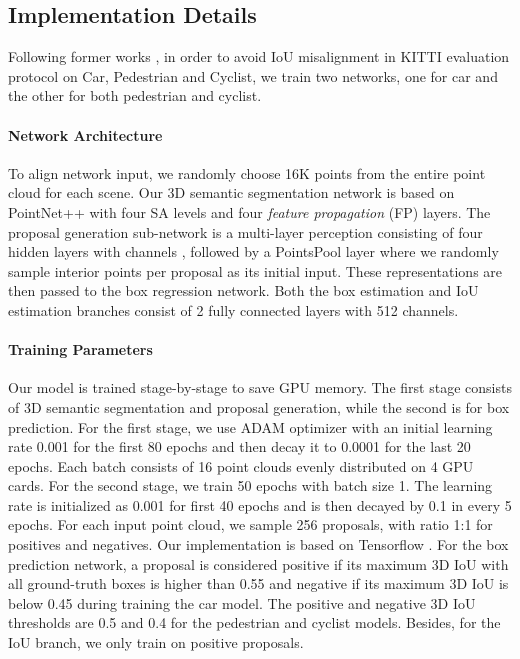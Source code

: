\documentclass[10pt,twocolumn,letterpaper]{article}
\begin{document}
\subsection{Implementation Details}
Following former works \cite{VOXELNET,lang2018pointpillars,AVOD,yan2018second}, in order to avoid IoU misalignment in KITTI evaluation protocol on Car, Pedestrian and Cyclist, we train two networks, one for car and the other for both pedestrian and cyclist.

\vspace{-0.1in}
\paragraph{Network Architecture}
To align network input, we randomly choose 16K points from the entire point cloud for each scene.
Our 3D semantic segmentation network is based on PointNet++ with four SA levels and four {\it feature propagation} (FP) layers. 
The proposal generation sub-network is a multi-layer perception consisting of four hidden layers with channels , followed by a PointsPool layer where we randomly sample  interior points per proposal as its initial input. These representations are then passed to the box regression network. Both the box estimation and IoU estimation branches consist of 2 fully connected layers with 512 channels. 

\vspace{-0.1in}
\paragraph{Training Parameters} 
Our model is trained stage-by-stage to save GPU memory. The first stage consists of 3D semantic segmentation and proposal generation, while the second is for box prediction. For the first stage, we use ADAM \cite{AdamOptimizer} optimizer with an initial learning rate 0.001 for the first 80 epochs and then decay it to 0.0001 for the last 20 epochs. Each batch consists of 16 point clouds evenly distributed on 4 GPU cards. 
For the second stage, we train 50 epochs with batch size 1. The learning rate is initialized as 0.001 for first 40 epochs and is then decayed by 0.1 in every 5 epochs.
For each input point cloud, we sample 256 proposals, with ratio 1:1 for positives and negatives.
Our implementation is based on Tensorflow \cite{Tensorflow}. For the box prediction network, a proposal is considered positive if its maximum 3D IoU with all ground-truth boxes is higher than 0.55 and negative if its maximum 3D IoU is below 0.45 during training the car model. The positive and negative 3D IoU thresholds are 0.5 and 0.4 for the pedestrian and cyclist models. 
Besides, for the IoU branch, we only train on positive proposals.
\end{document}
